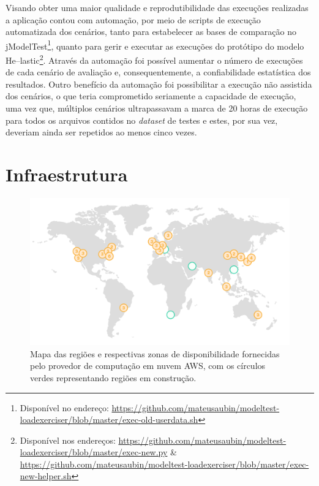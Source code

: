 \documentclass[english,brazilian]{UNISINOSmonografia} %
\newcommand\defaultFigureWidth{0.9}
\begin{document}
Visando obter uma maior qualidade e reprodutibilidade das execuções realizadas a aplicação contou com automação, por meio de scripts de execução automatizada dos cenários, tanto para estabelecer as bases de comparação no jModelTest\footnote{Disponível no endereço: \url{https://github.com/mateusaubin/modeltest-loadexerciser/blob/master/exec-old-userdata.sh}}, quanto para gerir e executar as execuções do protótipo do modelo \textsf{He}--lastic\footnote{
	Disponível nos endereços: \url{https://github.com/mateusaubin/modeltest-loadexerciser/blob/master/exec-new.py}
	\&
	\url{https://github.com/mateusaubin/modeltest-loadexerciser/blob/master/exec-new-helper.sh}
}. 
Através da automação foi possível aumentar o número de execuções de cada cenário de avaliação e, consequentemente, a confiabilidade estatística dos resultados.
Outro benefício da automação foi possibilitar a execução não assistida dos cenários, o que teria comprometido seriamente a capacidade de execução, uma vez que, múltiplos cenários ultrapassavam a marca de 20 horas de execução para todos os arquivos contidos no \textit{dataset} de testes e estes, por sua vez, deveriam ainda ser repetidos ao menos cinco vezes.







\section{Infraestrutura}
\label{sec:metodologia-infra}


\begin{figure}[tb]
	\centering%
	\begin{minipage}{\defaultFigureWidth\textwidth}
		\caption{Mapa das regiões e respectivas zonas de disponibilidade fornecidas pelo provedor de computação em nuvem AWS, com os círculos verdes representando regiões em construção.}
		\label{fig:metodologia-infra-awsregions}
		\includegraphics[width=\textwidth]{aws-regions}
	\end{minipage}
\end{figure}
\end{document}
